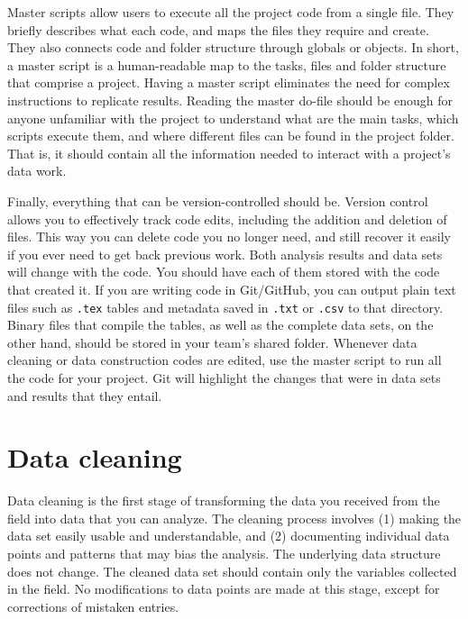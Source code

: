 Master scripts allow users to execute all the project code from a single file.
They briefly describes what each code, 
and maps the files they require and create. 
They also connects code and folder structure through globals or objects. 
In short, a master script is a human-readable map to the tasks, 
files and folder structure that comprise a project.  
Having a master script eliminates the need for complex instructions to replicate results. 
Reading the master do-file should be enough for anyone unfamiliar with the project
to understand what are the main tasks, which scripts execute them,
and where different files can be found in the project folder. 
That is, it should contain all the information needed to interact with a project's data work.

Finally, everything that can be version-controlled should be. 
Version control allows you to effectively track code edits,
including the addition and deletion of files. 
This way you can delete code you no longer need, 
and still recover it easily if you ever need to get back previous work.
Both analysis results and data sets will change with the code.
You should have each of them stored with the code that created it.
If you are writing code in Git/GitHub,
you can output plain text files such as \texttt{.tex} tables
and metadata saved in \texttt{.txt} or \texttt{.csv} to that directory.
Binary files that compile the tables,
as well as the complete data sets, on the other hand,
should be stored in your team's shared folder. 
Whenever data cleaning or data construction codes are edited,
use the master script to run all the code for your project.
Git will highlight the changes that were in data sets and results that they entail. 


\section{Data cleaning}

Data cleaning is the first stage of transforming the data you received from the field into data that you can analyze.
The cleaning process involves (1) making the data set easily usable and understandable, 
and (2) documenting individual data points and patterns that may bias the analysis.
The underlying data structure does not change.
The cleaned data set should contain only the variables collected in the field.
No modifications to data points are made at this stage, except for corrections of mistaken entries.

